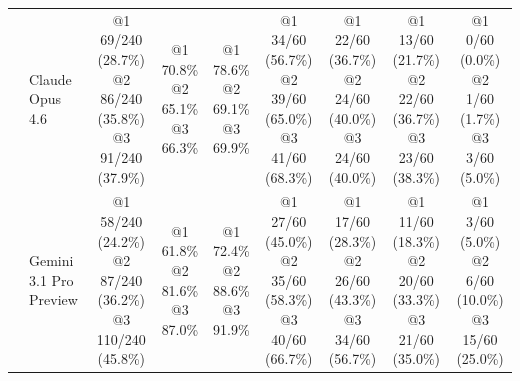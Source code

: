 \begin{table}[!t]
{\begin{tabular}{@{}llccccccc@{}}
& Claude Opus 4.6 & \shortstack[l]{@1 69/240 (28.7\%)\\@2 86/240 (35.8\%)\\@3 91/240 (37.9\%)} & \shortstack[l]{@1 70.8\%\\@2 65.1\%\\@3 66.3\%} & \shortstack[l]{@1 78.6\%\\@2 69.1\%\\@3 69.9\%} & \shortstack[l]{@1 34/60 (56.7\%)\\@2 39/60 (65.0\%)\\@3 41/60 (68.3\%)} & \shortstack[l]{@1 22/60 (36.7\%)\\@2 24/60 (40.0\%)\\@3 24/60 (40.0\%)} & \shortstack[l]{@1 13/60 (21.7\%)\\@2 22/60 (36.7\%)\\@3 23/60 (38.3\%)} & \shortstack[l]{@1 0/60 (0.0\%)\\@2 1/60 (1.7\%)\\@3 3/60 (5.0\%)} \\
& Gemini 3.1 Pro Preview & \shortstack[l]{@1 58/240 (24.2\%)\\@2 87/240 (36.2\%)\\@3 110/240 (45.8\%)} & \shortstack[l]{@1 61.8\%\\@2 81.6\%\\@3 87.0\%} & \shortstack[l]{@1 72.4\%\\@2 88.6\%\\@3 91.9\%} & \shortstack[l]{@1 27/60 (45.0\%)\\@2 35/60 (58.3\%)\\@3 40/60 (66.7\%)} & \shortstack[l]{@1 17/60 (28.3\%)\\@2 26/60 (43.3\%)\\@3 34/60 (56.7\%)} & \shortstack[l]{@1 11/60 (18.3\%)\\@2 20/60 (33.3\%)\\@3 21/60 (35.0\%)} & \shortstack[l]{@1 3/60 (5.0\%)\\@2 6/60 (10.0\%)\\@3 15/60 (25.0\%)} \\
\bottomrule
\end{tabular}%
}
\end{table}
